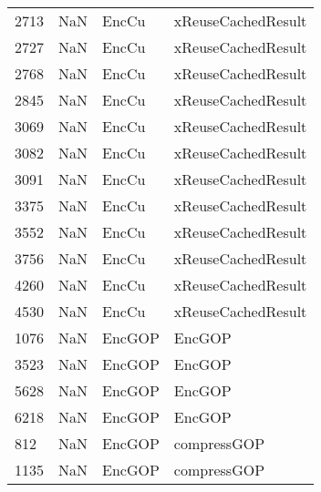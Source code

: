\begin{tabular}{llll}
2713 &                   NaN &                      EncCu &                        xReuseCachedResult \\
2727 &                   NaN &                      EncCu &                        xReuseCachedResult \\
2768 &                   NaN &                      EncCu &                        xReuseCachedResult \\
2845 &                   NaN &                      EncCu &                        xReuseCachedResult \\
3069 &                   NaN &                      EncCu &                        xReuseCachedResult \\
3082 &                   NaN &                      EncCu &                        xReuseCachedResult \\
3091 &                   NaN &                      EncCu &                        xReuseCachedResult \\
3375 &                   NaN &                      EncCu &                        xReuseCachedResult \\
3552 &                   NaN &                      EncCu &                        xReuseCachedResult \\
3756 &                   NaN &                      EncCu &                        xReuseCachedResult \\
4260 &                   NaN &                      EncCu &                        xReuseCachedResult \\
4530 &                   NaN &                      EncCu &                        xReuseCachedResult \\
1076 &                   NaN &                     EncGOP &                                    EncGOP \\
3523 &                   NaN &                     EncGOP &                                    EncGOP \\
5628 &                   NaN &                     EncGOP &                                    EncGOP \\
6218 &                   NaN &                     EncGOP &                                    EncGOP \\
812  &                   NaN &                     EncGOP &                               compressGOP \\
1135 &                   NaN &                     EncGOP &                               compressGOP \\

\end{tabular}
